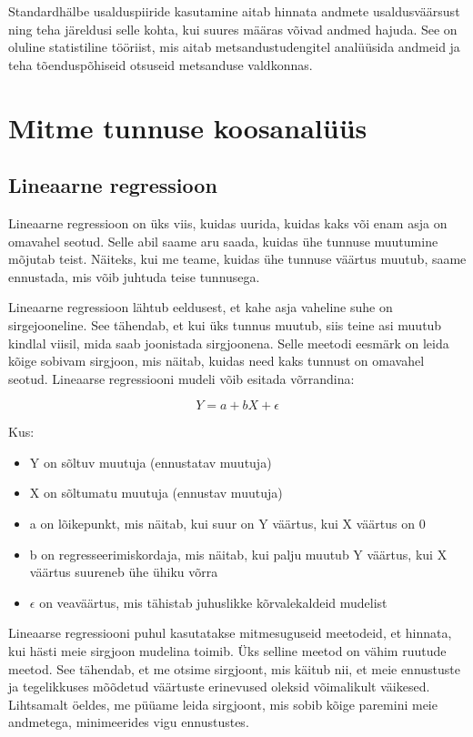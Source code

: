 \documentclass[
]{book}
\providecommand{\tightlist}{%
  \setlength{\itemsep}{0pt}\setlength{\parskip}{0pt}}
\begin{document}
Standardhälbe usalduspiiride kasutamine aitab hinnata andmete usaldusväärsust ning teha järeldusi selle kohta, kui suures määras võivad andmed hajuda. See on oluline statistiline tööriist, mis aitab metsandustudengitel analüüsida andmeid ja teha tõenduspõhiseid otsuseid metsanduse valdkonnas.

\chapter{Mitme tunnuse koosanalüüs}\label{mitme-tunnuse-koosanaluxfcuxfcs}

\section{Lineaarne regressioon}\label{lineaarne-regressioon}

Lineaarne regressioon on üks viis, kuidas uurida, kuidas kaks või enam asja on omavahel seotud. Selle abil saame aru saada, kuidas ühe tunnuse muutumine mõjutab teist. Näiteks, kui me teame, kuidas ühe tunnuse väärtus muutub, saame ennustada, mis võib juhtuda teise tunnusega.

Lineaarne regressioon lähtub eeldusest, et kahe asja vaheline suhe on sirgejooneline. See tähendab, et kui üks tunnus muutub, siis teine asi muutub kindlal viisil, mida saab joonistada sirgjoonena. Selle meetodi eesmärk on leida kõige sobivam sirgjoon, mis näitab, kuidas need kaks tunnust on omavahel seotud. Lineaarse regressiooni mudeli võib esitada võrrandina:

\[Y = a + bX + \epsilon \]

Kus:

\begin{itemize}
\tightlist
\item
  Y on sõltuv muutuja (ennustatav muutuja)
\item
  X on sõltumatu muutuja (ennustav muutuja)
\item
  a on lõikepunkt, mis näitab, kui suur on Y väärtus, kui X väärtus on 0
\item
  b on regresseerimiskordaja, mis näitab, kui palju muutub Y väärtus, kui X väärtus suureneb ühe ühiku võrra
\item
  \(\epsilon\) on veaväärtus, mis tähistab juhuslikke kõrvalekaldeid mudelist
\end{itemize}

Lineaarse regressiooni puhul kasutatakse mitmesuguseid meetodeid, et hinnata, kui hästi meie sirgjoon mudelina toimib. Üks selline meetod on vähim ruutude meetod. See tähendab, et me otsime sirgjoont, mis käitub nii, et meie ennustuste ja tegelikkuses mõõdetud väärtuste erinevused oleksid võimalikult väikesed. Lihtsamalt öeldes, me püüame leida sirgjoont, mis sobib kõige paremini meie andmetega, minimeerides vigu ennustustes.
\end{document}
